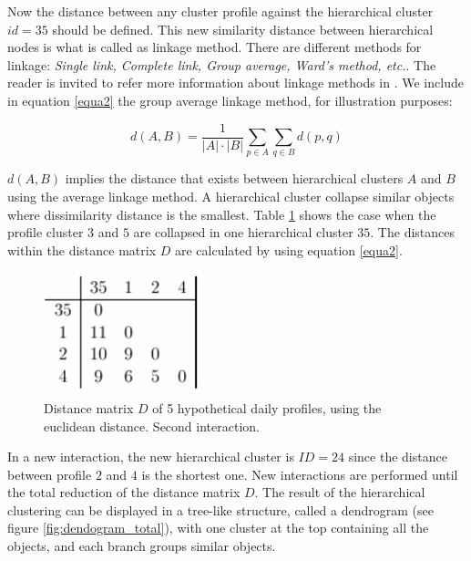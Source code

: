 Now the distance between any cluster profile against the hierarchical cluster $id=35$ should be defined. This new similarity distance between hierarchical nodes is what is called as linkage method. There are different methods for linkage: \textit{Single link, Complete link, Group average, Ward’s method, etc.}. The reader is invited to refer more information about linkage methods in \cite{maimon2007soft,saraccli2013comparison,mullner2011modern}. We include in equation \ref{equa2} the group average linkage method, for illustration purposes:

\begin{equation}
\label{equa2}
    d ( A , B ) = \dfrac{1}{|A| \cdot |B|} \sum_{p \in A} \sum_{q \in B} d(p,q)
\end{equation} 

$d(A ,B)$ implies the distance that exists between hierarchical clusters $A$ and $B$ using the average linkage method. A hierarchical cluster collapse similar objects where dissimilarity distance is the smallest. Table \ref{fig:matrix_2} shows the case when the profile cluster $3$ and $5$ are collapsed in one hierarchical cluster $35$. The distances within the distance matrix $D$ are calculated by using equation \ref{equa2}.  

\begin{figure}[h!]
  \vspace{0.5em} %
  \includegraphics[scale=0.65]{Figures/distance_matrix_2.jpg}
  \caption{Distance matrix $D$ of 5 hypothetical daily profiles, using the euclidean distance. Second interaction.}
  \label{fig:matrix_2}
\end{figure}

In a new interaction, the new hierarchical cluster is $ID=24$ since the distance between profile $2$ and $4$ is the shortest one. New interactions are performed until the total reduction of the distance matrix $D$. The result of the hierarchical clustering can be displayed in a tree-like structure, called a dendrogram (see figure \ref{fig:dendogram_total}), with one cluster at the top containing all the objects, and each branch groups similar objects. 

